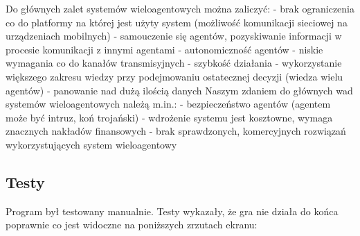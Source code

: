 \documentclass[12pt,a4paper]{article}
\begin{document}
Do głównych zalet systemów wieloagentowych można zaliczyć:\newline
- brak ograniczenia co do platformy na której jest użyty system (możliwość komunikacji sieciowej na urządzeniach mobilnych)\newline
- samouczenie się agentów, pozyskiwanie informacji w procesie komunikacji z innymi agentami\newline
- autonomiczność agentów\newline
- niskie wymagania co do kanałów transmisyjnych\newline
- szybkość działania \newline
- wykorzystanie  większego  zakresu  wiedzy  przy podejmowaniu ostatecznej decyzji (wiedza wielu agentów) \newline
- panowanie nad dużą ilością danych\newline \newline
Naszym zdaniem do głównych wad systemów wieloagentowych należą m.in.:\newline
- bezpieczeństwo agentów (agentem może być intruz, koń trojański)\newline
- wdrożenie systemu jest kosztowne, wymaga znacznych nakładów finansowych\newline
- brak sprawdzonych, komercyjnych rozwiązań wykorzystujących system wieloagentowy\newline
	
	\subsection*{Testy}
	
Program był testowany manualnie. Testy wykazały, że gra nie działa do końca poprawnie co jest widoczne na poniższych zrzutach ekranu:
\end{document}

